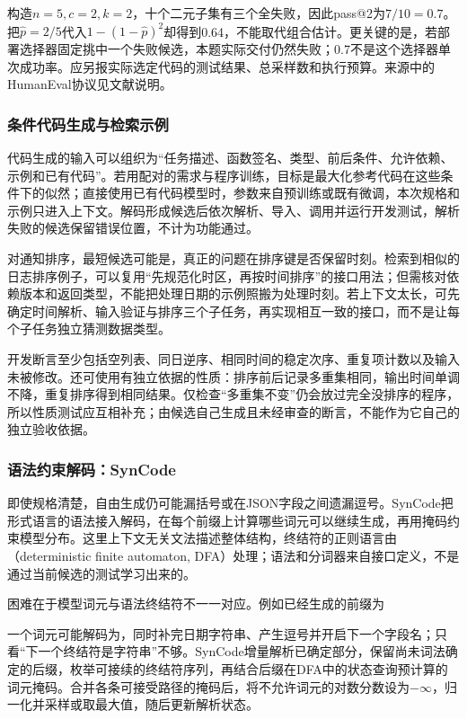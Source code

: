 构造$n=5,c=2,k=2$，十个二元子集有三个全失败，因此pass@2为$7/10=0.7$。把$\hat p=2/5$代入$1-(1-\hat p)^2$却得到0.64，不能取代组合估计。更关键的是，若部署选择器固定挑中一个失败候选，本题实际交付仍然失败；0.7不是这个选择器单次成功率。应另报实际选定代码的测试结果、总采样数和执行预算。来源中的HumanEval协议见文献说明。

\subsubsection{条件代码生成与检索示例}
\label{sec:nlp-execution-conditional-code}

代码生成的输入可以组织为“任务描述、函数签名、类型、前后条件、允许依赖、示例和已有代码”。若用配对的需求与程序训练，目标是最大化参考代码在这些条件下的似然；直接使用已有代码模型时，参数来自预训练或既有微调，本次规格和示例只进入上下文。解码形成候选后依次解析、导入、调用并运行开发测试，解析失败的候选保留错误位置，不计为功能通过。

对通知排序，最短候选可能是，真正的问题在排序键是否保留时刻。检索到相似的日志排序例子，可以复用“先规范化时区，再按时间排序”的接口用法；但需核对依赖版本和返回类型，不能把处理日期的示例照搬为处理时刻。若上下文太长，可先确定时间解析、输入验证与排序三个子任务，再实现相互一致的接口，而不是让每个子任务独立猜测数据类型。

开发断言至少包括空列表、同日逆序、相同时间的稳定次序、重复项计数以及输入未被修改。还可使用有独立依据的性质：排序前后记录多重集相同，输出时间单调不降，重复排序得到相同结果。仅检查“多重集不变”仍会放过完全没排序的程序，所以性质测试应互相补充；由候选自己生成且未经审查的断言，不能作为它自己的独立验收依据。

\subsubsection{语法约束解码：SynCode}
\label{sec:nlp-execution-syncode}

即使规格清楚，自由生成仍可能漏括号或在JSON字段之间遗漏逗号。SynCode把形式语言的语法接入解码，在每个前缀上计算哪些词元可以继续生成，再用掩码约束模型分布。这里上下文无关文法描述整体结构，终结符的正则语言由（deterministic finite automaton, DFA）处理；语法和分词器来自接口定义，不是通过当前候选的测试学习出来的。

困难在于模型词元与语法终结符不一一对应。例如已经生成的前缀为
\begin{quote}
\end{quote}
一个词元可能解码为，同时补完日期字符串、产生逗号并开启下一个字段名；只看“下一个终结符是字符串”不够。SynCode增量解析已确定部分，保留尚未词法确定的后缀，枚举可接续的终结符序列，再结合后缀在DFA中的状态查询预计算的词元掩码。合并各条可接受路径的掩码后，将不允许词元的对数分数设为$-\infty$，归一化并采样或取最大值，随后更新解析状态。

